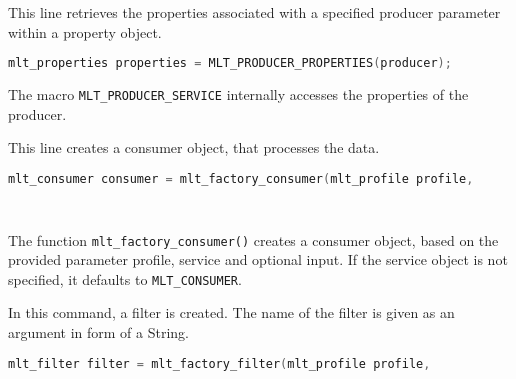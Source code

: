 \documentclass[../MasterThesis.tex]{subfiles}
\begin{document}
\begin{description}[font=\color{RedViolet!80!black}, style=nextline]
	
	
	\item[Create properties] 
	
	
	This line retrieves the properties associated with a specified producer parameter within a property object.
	
	\begin{lstlisting}[language=C, numbers=none, columns=fullflexible, belowskip=0pt, aboveskip=9pt]
	mlt_properties properties = MLT_PRODUCER_PROPERTIES(producer); \end{lstlisting}
	
	The macro \texttt{MLT\_PRODUCER\_SERVICE} internally accesses the properties of the producer.
	
	
	
	\item[Create a consumer] 
	
	This line creates a consumer object, that processes the data.
	
	\begin{lstlisting}[language=C, numbers=none, columns=fullflexible, belowskip=0pt, aboveskip=9pt]
	mlt_consumer consumer = mlt_factory_consumer(mlt_profile profile, 
																							const char* service, 
																							const void* input); \end{lstlisting}
																
	The function \texttt{mlt\_factory\_consumer()} creates a consumer object, based on the provided parameter profile, service and optional input. If the service object is not specified, it defaults to \texttt{MLT\_CONSUMER}.
											
																
	
	
	
	\item[Create a filter] 
	
	In this command, a filter is created. The name of the filter is given as an argument in form of a String.
	
	\begin{lstlisting}[language=C, numbers=none, columns=fullflexible, belowskip=0pt, aboveskip=9pt]
	mlt_filter filter = mlt_factory_filter(mlt_profile profile, 
																						const char* service, 
																						const void* input); \end{lstlisting}
														

\end{description}
\end{document}
